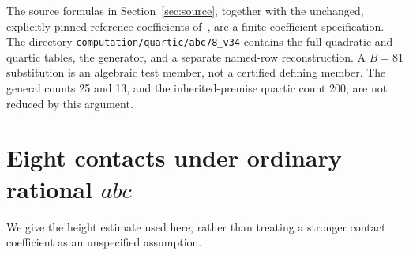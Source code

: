\documentclass[11pt,a4paper]{article}
\theoremstyle{remark}\newtheorem{remark}[theorem]{Remark}
\begin{document}
The source formulas in Section~\ref{sec:source}, together with the
unchanged, explicitly pinned reference coefficients of~\cite{Parent},
are a finite coefficient specification. The directory
\nolinkurl{computation/quartic/abc78_v34} contains the full quadratic and
quartic tables, the generator, and a separate named-row reconstruction.
A $B=81$ substitution is an algebraic test member, not a certified defining
member. The general counts 25 and 13, and the inherited-premise quartic
count 200, are not reduced by this argument.

\section{Eight contacts under ordinary rational $abc$}
We give the height estimate used here, rather than treating a stronger
contact coefficient as an unspecified assumption.
\end{document}
